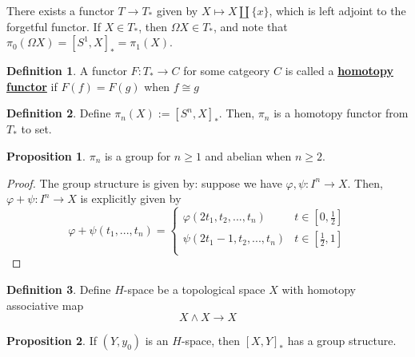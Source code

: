 \documentclass{article}
\theoremstyle{definition}
\theoremstyle{definition}
\newtheorem{definition}{Definition}[theorem]
\theoremstyle{definition}
\theoremstyle{definition}
\newtheorem{proposition}{Proposition}[theorem]
\theoremstyle{definition}
\theoremstyle{definition}
\theoremstyle{definition}
\begin{document}
There exists a functor $T\to T_*$ given by $X\mapsto X\coprod \{x\}$, which is left adjoint to the forgetful functor. If $X\in T_*$, then $\Omega X\in T_*$, and note that $\pi_0(\Omega X)=[S^1,X]_*=\pi_1(X)$. 


\begin{tcolorbox}[colback=purple!5!white,colframe=purple!75!black]
\begin{definition}
A functor $F: T_*\to C$ for some catgeory $C$ is called a \underline{\textbf{homotopy functor}} if $F(f)=F(g)$ when $f\cong g$
\end{definition}
\end{tcolorbox}



\begin{tcolorbox}[colback=purple!5!white,colframe=purple!75!black]
    \begin{definition}
    Define $\pi_n(X):= [S^n, X]_*$. Then, $\pi_n$ is a homotopy functor from $T_*$ to set.
    \end{definition}
    \end{tcolorbox}
    
    
    \begin{tcolorbox}[colback=blue!5!white,colframe=blue!30!white]
    \begin{proposition}
    $\pi_n$ is a group for $n\geq 1$ and abelian when $n\geq 2$. 
    \end{proposition}
    \end{tcolorbox}

    \begin{proof}
        The group structure is given by: suppose we have $\varphi,\psi: I^n\to X$. Then, $\varphi+\psi: I^n\to X$ is explicitly given by 
        \[\varphi+\psi(t_1,...,t_n)=
        \begin{cases}
            \varphi(2t_1,t_2,...,t_n)& t\in [0,\frac{1}{2}]\\
            \psi(2t_1-1,t_2,...,t_n)&t\in  [\frac{1}{2},1]\\
        \end{cases}
        \]
    \end{proof}

    
    \begin{tcolorbox}[colback=purple!5!white,colframe=purple!75!black]
    \begin{definition}
    Define $H$-space be a topological space $X$ with homotopy associative map 
    \[X\wedge X\to X\]
    \end{definition}
    \end{tcolorbox}

    
    \begin{tcolorbox}[colback=blue!5!white,colframe=blue!30!white]
    \begin{proposition}
    If $(Y,y_0)$ is an $H$-space, then $[X,Y]_*$ has a group structure. 
    \end{proposition}
    \end{tcolorbox}
\end{document}
